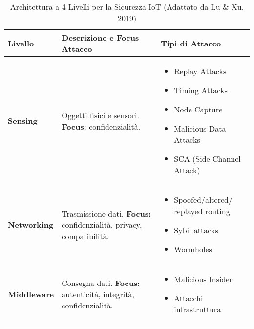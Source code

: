 \begin{table}[H]
\centering
\caption{Architettura a 4 Livelli per la Sicurezza IoT (Adattato da Lu \& Xu, 2019)}
\label{tab:iot_architecture}
\begin{tabular}{|p{}|p{}|p{}|}
\hline
\rowcolor{bg_custom}
\textcolor{primarytext}{\textbf{Livello}} & \textcolor{primarytext}{\textbf{Descrizione e Focus Attacco}} & \textcolor{primarytext}{\textbf{Tipi di Attacco}} \\
\hline
\textbf{Sensing} & Oggetti fisici e sensori. \newline \textbf{Focus:} confidenzialità. &
    \begin{itemize}[nosep, leftmargin=*, itemsep=-2pt, before=\vspace{-0.5\baselineskip}, after=\vspace{-\baselineskip}]
        \item Replay Attacks
        \item Timing Attacks
        \item Node Capture
        \item Malicious Data Attacks
        \item SCA (Side Channel Attack)
    \end{itemize} \\
\hline
\textbf{Networking} & Trasmissione dati. \newline \textbf{Focus:} confidenzialità, privacy, compatibilità. &
    \begin{itemize}[nosep, leftmargin=*, itemsep=-2pt, before=\vspace{-0.5\baselineskip}, after=\vspace{-\baselineskip}]
        \item Spoofed/altered/ replayed routing
        \item Sybil attacks
        \item Wormholes
    \end{itemize} \\
\hline
\textbf{Middleware} & Consegna dati. \newline \textbf{Focus:} autenticità, integrità, confidenzialità. &
    \begin{itemize}[nosep, leftmargin=*, itemsep=-2pt, before=\vspace{-0.5\baselineskip}, after=\vspace{-\baselineskip}]
        \item Malicious Insider
        \item Attacchi infrastruttura

\end{itemize}
\end{tabular}
\end{table}
